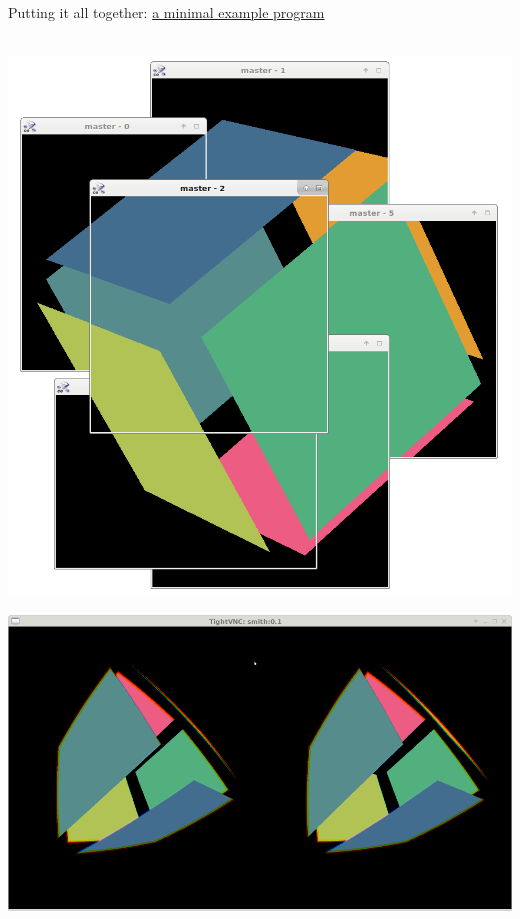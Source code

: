\documentclass[utf8,stillsansserifmath,fleqn,t]{beamer}
\begin{document}
\begin{frame}[fragile]
\frametitle{\insertsection}
Putting it all together:
\href{https://git.marlam.de/gitweb/?p=qvr.git;a=tree;hb=HEAD;f=qvr-example-opengl-minimal}{a minimal
example program}\\~\\
\begin{minipage}{.3\textwidth}
\includegraphics[width=\textwidth]{./fig/minimal-result-0.png}\\
\end{minipage}\hfill
\begin{minipage}{.3\textwidth}
\includegraphics[width=\textwidth]{./fig/minimal-result-1.png}\\

\end{minipage}
\end{frame}
\end{document}
